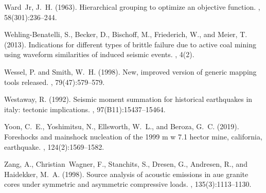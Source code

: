 \documentclass[a4paper,12pt,twoside]{article}
\begin{document}
\begin{thebibliography}{}
Ward~Jr, J.~H. (1963).
\newblock Hierarchical grouping to optimize an objective function.
,
  58(301):236--244.

Wehling-Benatelli, S., Becker, D., Bischoff, M., Friederich, W., and Meier, T.
  (2013).
\newblock Indications for different types of brittle failure due to active coal
  mining using waveform similarities of induced seismic events.
, 4(2).

Wessel, P. and Smith, W.~H. (1998).
\newblock New, improved version of generic mapping tools released.
, 79(47):579--579.

Westaway, R. (1992).
\newblock Seismic moment summation for historical earthquakes in italy:
  tectonic implications.
,
  97(B11):15437--15464.

Yoon, C.~E., Yoshimitsu, N., Ellsworth, W.~L., and Beroza, G.~C. (2019).
\newblock Foreshocks and mainshock nucleation of the 1999 m w 7.1 hector mine,
  california, earthquake.
,
  124(2):1569--1582.

Zang, A., Christian~Wagner, F., Stanchits, S., Dresen, G., Andresen, R., and
  Haidekker, M.~A. (1998).
\newblock Source analysis of acoustic emissions in aue granite cores under
  symmetric and asymmetric compressive loads.
, 135(3):1113--1130.

\end{thebibliography}
\end{document}
